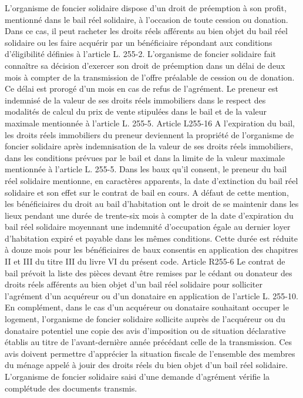 \documentclass[11pt,a4paper]{report}
\begin{document}
L'organisme de foncier solidaire dispose d'un droit de préemption à son profit, mentionné dans le bail réel
solidaire, à l'occasion de toute cession ou donation. Dans ce cas, il peut racheter les droits réels afférents au
bien objet du bail réel solidaire ou les faire acquérir par un bénéficiaire répondant aux conditions d'éligibilité
définies à l'article L. 255-2. L'organisme de foncier solidaire fait connaître sa décision d'exercer son droit de
préemption dans un délai de deux mois à compter de la transmission de l'offre préalable de cession ou de
donation. Ce délai est prorogé d'un mois en cas de refus de l'agrément.
Le preneur est indemnisé de la valeur de ses droits réels immobiliers dans le respect des modalités de calcul du
prix de vente stipulées dans le bail et de la valeur maximale mentionnée à l'article L. 255-5.
Article L255-16
A l'expiration du bail, les droits réels immobiliers du preneur deviennent la propriété de l'organisme de foncier
solidaire après indemnisation de la valeur de ses droits réels immobiliers, dans les conditions prévues par le
bail et dans la limite de la valeur maximale mentionnée à l'article L. 255-5.
Dans les baux qu'il consent, le preneur du bail réel solidaire mentionne, en caractères apparents, la date
d'extinction du bail réel solidaire et son effet sur le contrat de bail en cours.
A défaut de cette mention, les bénéficiaires du droit au bail d'habitation ont le droit de se maintenir dans les
lieux pendant une durée de trente-six mois à compter de la date d'expiration du bail réel solidaire moyennant
une indemnité d'occupation égale au dernier loyer d'habitation expiré et payable dans les mêmes conditions.
Cette durée est réduite à douze mois pour les bénéficiaires de baux consentis en application des chapitres II et
III du titre III du livre VI du présent code.
Article R255-6
Le contrat de bail prévoit la liste des pièces devant être remises par le cédant ou donateur des droits réels
afférents au bien objet d'un bail réel solidaire pour solliciter l'agrément d'un acquéreur ou d'un donataire en
application de l'article L. 255-10.
En complément, dans le cas d'un acquéreur ou donataire souhaitant occuper le logement, l'organisme de foncier
solidaire sollicite auprès de l'acquéreur ou du donataire potentiel une copie des avis d'imposition ou de situation
déclarative établis au titre de l'avant-dernière année précédant celle de la transmission. Ces avis doivent
permettre d'apprécier la situation fiscale de l'ensemble des membres du ménage appelé à jouir des droits réels
du bien objet d'un bail réel solidaire.
L'organisme de foncier solidaire saisi d'une demande d'agrément vérifie la complétude des documents transmis.
\end{document}
